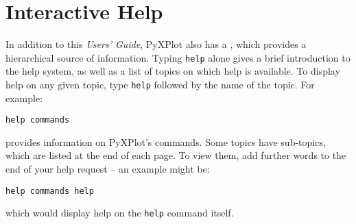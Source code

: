 \section{Interactive Help}

In addition to this {\it Users' Guide}, PyXPlot also has a ,
which provides a hierarchical source of information. Typing {\tt help} alone
gives a brief introduction to the help system, as well as a list of topics on
which help is available. To display help on any given topic, type {\tt help}
followed by the name of the topic. For example:

\begin{verbatim}
help commands
\end{verbatim}

\noindent provides information on PyXPlot's commands. Some topics have
sub-topics, which are listed at the end of each page. To view them, add further
words to the end of your help request -- an example might be:

\begin{verbatim}
help commands help
\end{verbatim}

\noindent which would display help on the {\tt help} command itself.

